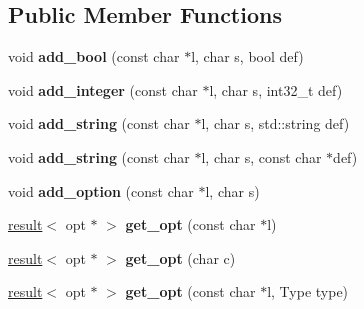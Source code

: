 \subsection*{Public Member Functions}
\begin{DoxyCompactItemize}
\item 
void {\bfseries add\+\_\+bool} (const char $\ast$l, char s, bool def)\hypertarget{classgxx_1_1cliopts_ae689fa36031b2f658351566aa071db2e}{}\label{classgxx_1_1cliopts_ae689fa36031b2f658351566aa071db2e}

\item 
void {\bfseries add\+\_\+integer} (const char $\ast$l, char s, int32\+\_\+t def)\hypertarget{classgxx_1_1cliopts_a597b367bb723b5e73de4ae2baa469760}{}\label{classgxx_1_1cliopts_a597b367bb723b5e73de4ae2baa469760}

\item 
void {\bfseries add\+\_\+string} (const char $\ast$l, char s, std\+::string def)\hypertarget{classgxx_1_1cliopts_a29ce9b9348072dcd945981cebad8ddc1}{}\label{classgxx_1_1cliopts_a29ce9b9348072dcd945981cebad8ddc1}

\item 
void {\bfseries add\+\_\+string} (const char $\ast$l, char s, const char $\ast$def)\hypertarget{classgxx_1_1cliopts_ae2b28f83c317888494b2819b151d6652}{}\label{classgxx_1_1cliopts_ae2b28f83c317888494b2819b151d6652}

\item 
void {\bfseries add\+\_\+option} (const char $\ast$l, char s)\hypertarget{classgxx_1_1cliopts_a22c702620fe35d24abce9c99d38629c9}{}\label{classgxx_1_1cliopts_a22c702620fe35d24abce9c99d38629c9}

\item 
\hyperlink{classgxx_1_1result__type_1_1result}{result}$<$ opt $\ast$ $>$ {\bfseries get\+\_\+opt} (const char $\ast$l)\hypertarget{classgxx_1_1cliopts_a4479d8c7b3e9bc9a12d2dc1887633f9d}{}\label{classgxx_1_1cliopts_a4479d8c7b3e9bc9a12d2dc1887633f9d}

\item 
\hyperlink{classgxx_1_1result__type_1_1result}{result}$<$ opt $\ast$ $>$ {\bfseries get\+\_\+opt} (char c)\hypertarget{classgxx_1_1cliopts_aa73c0d8d2658e2a4339f5e13f69b9ace}{}\label{classgxx_1_1cliopts_aa73c0d8d2658e2a4339f5e13f69b9ace}

\item 
\hyperlink{classgxx_1_1result__type_1_1result}{result}$<$ opt $\ast$ $>$ {\bfseries get\+\_\+opt} (const char $\ast$l, Type type)\hypertarget{classgxx_1_1cliopts_a77194b27fe885effa4c098ad8cbb8a25}{}\label{classgxx_1_1cliopts_a77194b27fe885effa4c098ad8cbb8a25}


\end{DoxyCompactItemize}
